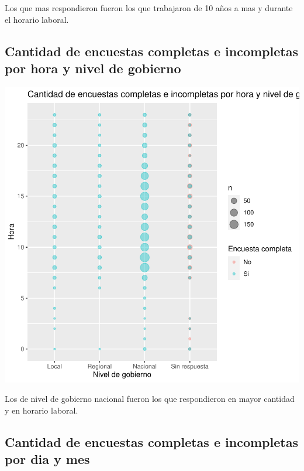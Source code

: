 \documentclass{article}
\begin{document}
Los que mas respondieron fueron los que trabajaron de 10 años a mas y durante el horario laboral.

\subsection{Cantidad de encuestas completas e incompletas por hora y nivel de gobierno}

\includegraphics{seguimientov3-014}

Los de nivel de gobierno nacional fueron los que respondieron en mayor cantidad y en horario laboral.

\subsection{Cantidad de encuestas completas e incompletas por dia y mes}
\end{document}
